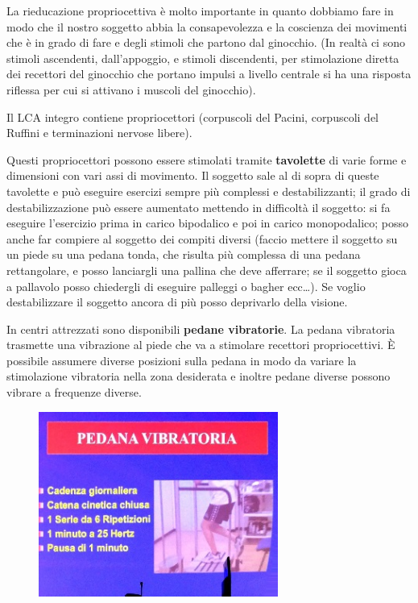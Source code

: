 La rieducazione propriocettiva è molto importante in quanto dobbiamo
fare in modo che il nostro soggetto abbia la consapevolezza e la
coscienza dei movimenti che è in grado di fare e degli stimoli che
partono dal ginocchio. (In realtà ci sono stimoli ascendenti,
dall'appoggio, e stimoli discendenti, per stimolazione diretta dei
recettori del ginocchio che portano impulsi a livello centrale si ha una
risposta riflessa per cui si attivano i muscoli del ginocchio).

Il LCA integro contiene propriocettori (corpuscoli del Pacini,
corpuscoli del Ruffini e terminazioni nervose libere).

Questi propriocettori possono essere stimolati tramite
\textbf{tavolette} di varie forme e dimensioni con vari assi di
movimento. Il soggetto sale al di sopra di queste tavolette e può
eseguire esercizi sempre più complessi e destabilizzanti; il grado di
destabilizzazione può essere aumentato mettendo in difficoltà il
soggetto: si fa eseguire l'esercizio prima in carico bipodalico e poi in
carico monopodalico; posso anche far compiere al soggetto dei compiti
diversi (faccio mettere il soggetto su un piede su una pedana tonda, che
risulta più complessa di una pedana rettangolare, e posso lanciargli una
pallina che deve afferrare; se il soggetto gioca a pallavolo posso
chiedergli di eseguire palleggi o bagher ecc\ldots{}). Se voglio
destabilizzare il soggetto ancora di più posso deprivarlo della visione.

In centri attrezzati sono disponibili \textbf{pedane vibratorie}. La
pedana vibratoria trasmette una vibrazione al piede che va a stimolare
recettori propriocettivi. È possibile assumere diverse posizioni sulla
pedana in modo da variare la stimolazione vibratoria nella zona
desiderata e inoltre
pedane diverse possono vibrare a frequenze diverse.
\begin{figure}[!ht]
\centering
	\includegraphics[width=0.7\textwidth]{030/image8.jpeg}
\end{figure}


